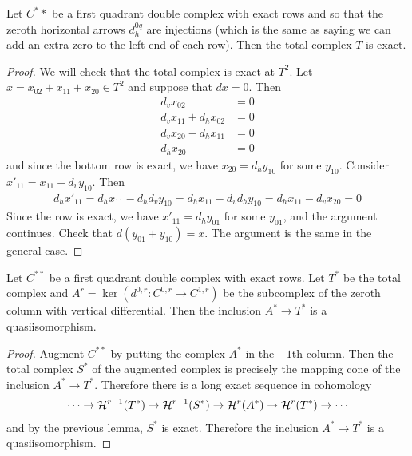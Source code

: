 \documentclass[12pt]{article}
\begin{document}
\begin{lemma}
    Let $C^**$ be a first quadrant double complex with exact rows and so that the zeroth
    horizontal arrows $d_h^{0q}$ are injections (which is the same as saying we
    can add an extra zero to the left end of each row). Then the total complex
    $T$ is exact.
\end{lemma}

\begin{proof}
    We will check that the total complex is exact at $T^2$. Let $x = x_{02} + x_{11} + x_{20} \in T^2$
    and suppose that $dx = 0$. Then \begin{align*}
        d_v x_{02}            & = 0 \\
        d_vx_{11} + d_hx_{02} & = 0 \\
        d_vx_{20} - d_hx_{11} & = 0 \\
        d_hx_{20}             & = 0
    \end{align*} and since the bottom row is exact, we have $x_{20} = d_hy_{10}$ for some $y_{10}$.
    Consider $x'_{11} = x_{11} - d_vy_{10}$. Then \begin{align*}
        d_hx'_{11} = d_hx_{11} - d_hd_vy_{10} = d_hx_{11} - d_vd_hy_{10} = d_hx_{11} - d_vx_{20} = 0
    \end{align*} Since the row is exact, we have $x'_{11} = d_hy_{01}$ for some $y_{01}$,
    and the argument continues. Check that $d(y_{01} + y_{10}) = x$. The
    argument is the same in the general case.
\end{proof}

\begin{corollary}
    Let $C^{**}$ be a first quadrant double complex with exact rows. Let $T^*$
    be the total complex and $A^r = \ker(d^{0,r}:C^{0,r}\to C^{1,r})$ be the subcomplex of the zeroth
    column with vertical differential. Then the inclusion $A^* \to T^*$ is a quasiisomorphism.
\end{corollary}

\begin{proof}
    Augment $C^{**}$ by putting the complex $A^*$ in the $-1$th column. Then the total
    complex $S^*$ of the augmented complex is precisely the mapping cone of
    the inclusion $A^* \to T^*$. Therefore there is a long exact sequence in cohomology \begin{align*}
        \cdots \to {\mathcal{H}}^{r-1}(T^*) \to {\mathcal{H}}^{r-1}(S^*) \to {\mathcal{H}}^r(A^*) \to {\mathcal{H}}^r(T^*) \to \cdots
    \end{align*} and by the previous lemma, $S^*$ is exact. Therefore the inclusion $A^* \to T^*$
    is a quasiisomorphism.
\end{proof}
\end{document}

